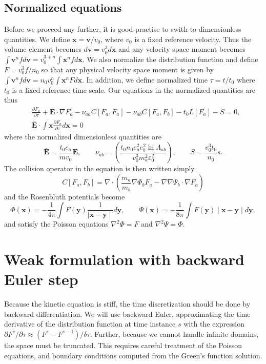 \documentclass[reprint]{revtex4}
\begin{document}
\subsection{Normalized equations}
Before we proceed any further, it is good practise to swith to dimensionless quantities. We define $\bm{x}=\bm{v}/v_0$, where $v_0$ is a fixed reference velocity. Thus the volume element becomes $d\bm{v}=v_0^3d\bm{x}$ and any velocity space moment becomes $\int \bm{v}^n fd\bm{v}=v_0^{3+n}\int \bm{x}^nf d\bm{x}$. We also normalize the distribution function and define $F=v_0^3f/n_0$ so that any physical velocity space moment is given by $\int \bm{v}^n fd\bm{v}=n_0v_0^{n}\int \bm{x}^nF d\bm{x}$. In addition, we define normalized time $\tau=t/t_0$ where $t_0$ is a fixed reference time scale. Our equations in the normalized quantities are thus
\begin{align}
&\frac{\partial F_a}{\partial\tau}+\bar{\bm{E}}\cdot\nabla F_a-\nu_{aa} C[F_a,F_a]-\nu_{ab} C[F_a,F_b]-t_0L[F_a]-S=0,\\
&\bar{\bm{E}}\cdot\int\bm{x}\frac{\partial F_a}{\partial\tau}d\bm{x}=0
\end{align}
where the normalized dimensionless quantities are
\begin{equation}
\bar{\bm{E}}=\frac{t_0e_a}{mv_0}\bm{E},\qquad \nu_{ab}=\left(\frac{t_0n_0e_a^2e_b^2\ln\Lambda_{ab}}{v_0^3m_a^2\varepsilon_0^2}\right),\qquad S=\frac{v_0^3t_0}{n_0}s.
\end{equation}
The collision operator in the equation is then written simply
\begin{equation}
C[F_a,F_b]=\nabla\cdot\left(\frac{m_a}{m_b}\nabla\Phi_b F_a-\nabla\nabla\Psi_b\cdot\nabla F_a\right)
\end{equation}
and the Rosenbluth potentials become
\begin{equation}
\Phi(\bm{x})=-\frac{1}{4\pi}\int F(\bm{y})\frac{1}{\mid \bm{x}-\bm{y}\mid}d\bm{y},\qquad \Psi(\bm{x})=-\frac{1}{8\pi}\int F(\bm{y})\mid \bm{x}-\bm{y}\mid d\bm{y},
\end{equation}
and satisfy the Poisson equations $\nabla^2\Phi = F$ and $\nabla^2\Psi =\Phi$.

\section{Weak formulation with backward Euler step}
Because the kinetic equation is stiff, the time discretization should be done by backward differentiation. We will use backward Euler, approximating the time derivative of the distribution function at time instance $s$ with the expression $\partial F^{s}/\partial\tau\approx (F^{s}-F^{s-1})/\delta \tau$. Further, because we cannot handle infinite domains, the space must be truncated. This requires careful treatment of the Poisson equations, and boundary conditions computed from the Green's function solution.
\end{document}

